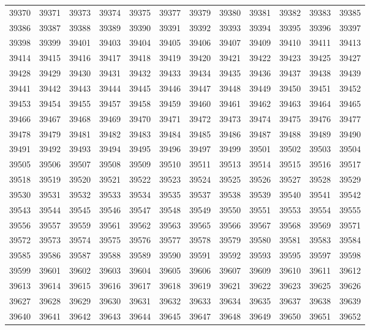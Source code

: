 \begin{center}
\begin{longtable}{llllllllllll}
39370 &39371 &39373 &39374 &39375 &39377 &39379 &39380 &39381 &39382 &39383 &39385 \\
39386 &39387 &39388 &39389 &39390 &39391 &39392 &39393 &39394 &39395 &39396 &39397 \\
39398 &39399 &39401 &39403 &39404 &39405 &39406 &39407 &39409 &39410 &39411 &39413 \\
39414 &39415 &39416 &39417 &39418 &39419 &39420 &39421 &39422 &39423 &39425 &39427 \\
39428 &39429 &39430 &39431 &39432 &39433 &39434 &39435 &39436 &39437 &39438 &39439 \\
39441 &39442 &39443 &39444 &39445 &39446 &39447 &39448 &39449 &39450 &39451 &39452 \\
39453 &39454 &39455 &39457 &39458 &39459 &39460 &39461 &39462 &39463 &39464 &39465 \\
39466 &39467 &39468 &39469 &39470 &39471 &39472 &39473 &39474 &39475 &39476 &39477 \\
39478 &39479 &39481 &39482 &39483 &39484 &39485 &39486 &39487 &39488 &39489 &39490 \\
39491 &39492 &39493 &39494 &39495 &39496 &39497 &39499 &39501 &39502 &39503 &39504 \\
39505 &39506 &39507 &39508 &39509 &39510 &39511 &39513 &39514 &39515 &39516 &39517 \\
39518 &39519 &39520 &39521 &39522 &39523 &39524 &39525 &39526 &39527 &39528 &39529 \\
39530 &39531 &39532 &39533 &39534 &39535 &39537 &39538 &39539 &39540 &39541 &39542 \\
39543 &39544 &39545 &39546 &39547 &39548 &39549 &39550 &39551 &39553 &39554 &39555 \\
39556 &39557 &39559 &39561 &39562 &39563 &39565 &39566 &39567 &39568 &39569 &39571 \\
39572 &39573 &39574 &39575 &39576 &39577 &39578 &39579 &39580 &39581 &39583 &39584 \\
39585 &39586 &39587 &39588 &39589 &39590 &39591 &39592 &39593 &39595 &39597 &39598 \\
39599 &39601 &39602 &39603 &39604 &39605 &39606 &39607 &39609 &39610 &39611 &39612 \\
39613 &39614 &39615 &39616 &39617 &39618 &39619 &39621 &39622 &39623 &39625 &39626 \\
39627 &39628 &39629 &39630 &39631 &39632 &39633 &39634 &39635 &39637 &39638 &39639 \\
39640 &39641 &39642 &39643 &39644 &39645 &39647 &39648 &39649 &39650 &39651 &39652 \\

\end{longtable}
\end{center}
